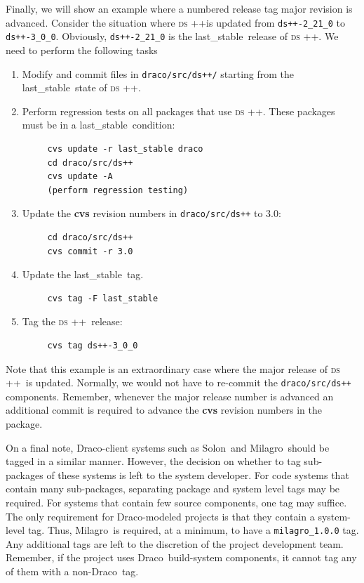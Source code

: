 \documentclass[11pt]{nmemo}
\newcommand{\draco}{{\normalfont\normalsize\sffamily Draco}}
\newcommand{\milagro}{{\normalfont\normalsize\sffamily Milagro}}
\newcommand{\solon}{{\normalfont\normalsize\sffamily Solon}}
\newcommand{\dsxx}{{\normalfont\normalsize\scshape ds\raisebox{.2ex}
  {\scriptsize ++}}}
\newcommand{\stable}{{\normalfont\normalsize\ttfamily last\_stable}}
\begin{document}
Finally, we will show an example where a numbered release tag major
revision is advanced.  Consider the situation where \dsxx is updated
from \texttt{ds++-2\_21\_0} to \texttt{ds++-3\_0\_0}.  Obviously,
\texttt{ds++-2\_21\_0} is the \stable\ release of \dsxx.  We need to
perform the following tasks
\begin{enumerate}
\item Modify and commit files in \texttt{draco/src/ds++/} starting
  from the \stable\ state of \dsxx.
\item Perform regression tests on all packages that use \dsxx.  These
  packages must be in a \stable\ condition:
\begin{verbatim}
     cvs update -r last_stable draco
     cd draco/src/ds++
     cvs update -A
     (perform regression testing)
\end{verbatim}
\item Update the {\bf cvs} revision numbers in \texttt{draco/src/ds++} 
  to 3.0:
\begin{verbatim}
     cd draco/src/ds++
     cvs commit -r 3.0
\end{verbatim}
\item Update the \stable\ tag.
\begin{verbatim}
     cvs tag -F last_stable
\end{verbatim}
\item Tag the \dsxx\ release:
\begin{verbatim}
     cvs tag ds++-3_0_0
\end{verbatim}
\end{enumerate}
Note that this example is an extraordinary case where the major
release of \dsxx\ is updated.  Normally, we would not have to
re-commit the \texttt{draco/src/ds++} components.  Remember, whenever
the major release number is advanced an additional commit is required
to advance the {\bf cvs} revision numbers in the package.

On a final note, \draco-client systems such as \solon\ and \milagro\ 
should be tagged in a similar manner.  However, the decision on
whether to tag sub-packages of these systems is left to the system
developer.  For code systems that contain many sub-packages,
separating package and system level tags may be required.  For systems
that contain few source components, one tag may suffice.  The only
requirement for \draco-modeled projects is that they contain a
system-level tag.  Thus, \milagro\ is required, at a minimum, to have
a \texttt{milagro\_1.0.0} tag.  Any additional tags are left to the
discretion of the project development team.  Remember, if the project
uses \draco\ build-system components, it cannot tag any of them with a
non-\draco\ tag.
\end{document}
